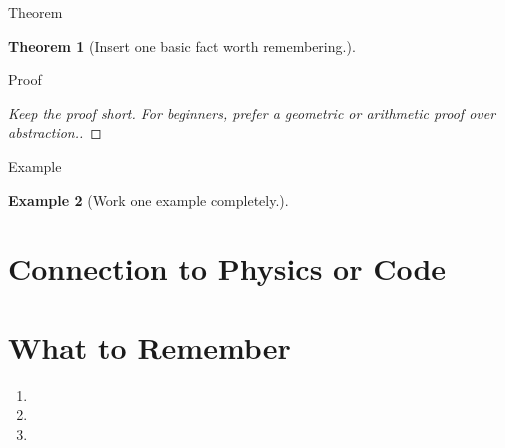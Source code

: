 \documentclass[11pt,a4paper]{article}
\newtheorem{theorem}{Theorem}[section]
\newtheorem{example}[theorem]{Example}
\begin{document}
\begin{mathblock}{Theorem}
\begin{theorem}
[Insert one basic fact worth remembering.]
\end{theorem}
\end{mathblock}

\begin{mathblock}{Proof}
\begin{proof}
[Keep the proof short. For beginners, prefer a geometric or arithmetic proof over abstraction.]
\end{proof}
\end{mathblock}

\begin{mathblock}{Example}
\begin{example}
[Work one example completely.]
\end{example}
\end{mathblock}

\section{Connection to Physics or Code}

\begin{problemblock}
\end{problemblock}

\begin{solutionblock}
\end{solutionblock}

\section{What to Remember}

\begin{enumerate}[label=\arabic*.]
  \item [Key point 1]
  \item [Key point 2]
  \item [Key point 3]
\end{enumerate}

\begin{keypointblock}
\end{keypointblock}
\end{document}
